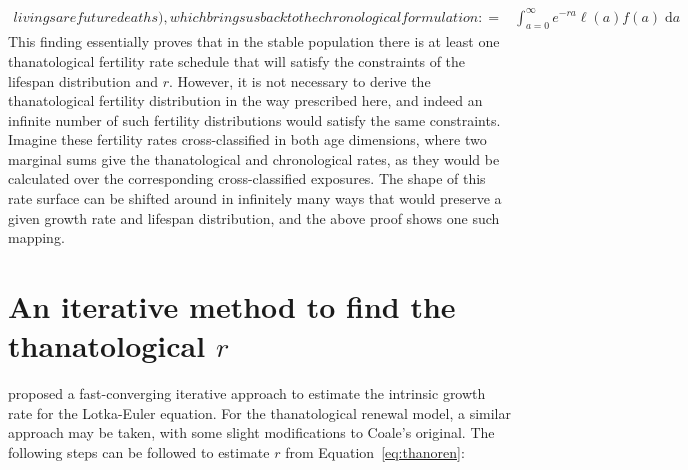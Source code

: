 \documentclass{article}
\newcommand{\dd}{\; \mathrm{d}}
\begin{document}
\begin{appendices}
\begin{align}
{livings are future deaths), which brings us back to the chronological
formulation:} =& \int_{a=0}^\infty e^{-ra}\ell(a)f(a)
\dd a
\end{align}
This finding essentially proves that in the stable population there is at least
one thanatological fertility rate schedule that will satisfy the constraints of
the lifespan distribution and $r$. However, it is not necessary to derive the
thanatological fertility distribution in the way prescribed here, and indeed an
infinite number of such fertility distributions would satisfy the same
constraints. Imagine these fertility rates cross-classified in
both age dimensions, where two marginal sums give the thanatological and
chronological rates, as they would be calculated over the
corresponding cross-classified exposures. The shape of this rate surface can be
shifted around in infinitely many ways that would preserve a given growth rate
and lifespan distribution, and the above proof shows one such mapping.

\section{An iterative method to find the thanatological $r$}
\label{app:C}
\citet{coale1957new} proposed a fast-converging iterative approach to estimate
the intrinsic growth rate for the Lotka-Euler equation. For the thanatological
renewal model, a similar approach may be taken, with some slight
modifications to Coale's original.
The following steps can be followed to estimate $r$ from
Equation~\eqref{eq:thanoren}:


\end{appendices}
\end{document}
